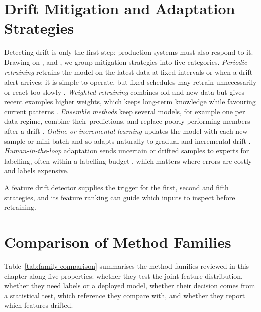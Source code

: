 \section{Drift Mitigation and Adaptation Strategies}
\label{sec:mitigation}
Detecting drift is only the first step; production systems must also respond to it. Drawing on \citet{Lu2018}, \citet{Gama2014} and \citet{Krawczyk2017}, we group mitigation strategies into five categories. \emph{Periodic retraining} retrains the model on the latest data at fixed intervals or when a drift alert arrives; it is simple to operate, but fixed schedules may retrain unnecessarily or react too slowly \citep{Gama2014}. \emph{Weighted retraining} combines old and new data but gives recent examples higher weights, which keeps long-term knowledge while favouring current patterns \citep{Krawczyk2017}. \emph{Ensemble methods} keep several models, for example one per data regime, combine their predictions, and replace poorly performing members after a drift \citep{Krawczyk2017}. \emph{Online or incremental learning} updates the model with each new sample or mini-batch and so adapts naturally to gradual and incremental drift \citep{Gama2014, Ditzler2015}. \emph{Human-in-the-loop} adaptation sends uncertain or drifted samples to experts for labelling, often within a labelling budget \citep{Lu2018}, which matters where errors are costly and labels expensive.

A feature drift detector supplies the trigger for the first, second and fifth strategies, and its feature ranking can guide which inputs to inspect before retraining.

\section{Comparison of Method Families}
\label{sec:lit-comparison}
Table~\ref{tab:family-comparison} summarises the method families reviewed in this chapter along five properties: whether they test the joint feature distribution, whether they need labels or a deployed model, whether their decision comes from a statistical test, which reference they compare with, and whether they report which features drifted.

